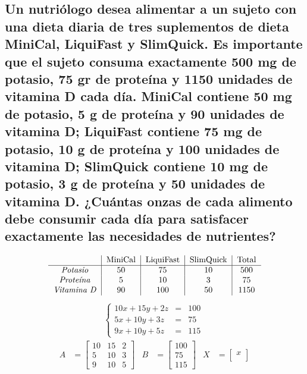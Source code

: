 \documentclass[10pt, a4paper]{article}
\begin{document}
\subsection{Un nutriólogo desea alimentar a un sujeto con una dieta diaria de tres suplementos de dieta MiniCal, LiquiFast y SlimQuick. Es importante que el sujeto consuma exactamente 500 mg de potasio, 75 gr de proteína y 1150 unidades de vitamina D cada día. MiniCal contiene 50 mg de potasio, 5 g de proteína y 90 unidades de vitamina D; LiquiFast contiene 75 mg de potasio, 10 g de proteína y 100 unidades de vitamina D; SlimQuick contiene 10 mg de potasio, 3 g de proteína y 50 unidades de vitamina D. ¿Cuántas onzas de cada alimento debe consumir cada día para satisfacer exactamente las necesidades de nutrientes?}
\begin{multicols*}{2}
  \columnseprule=1pt
\begin{align*}
  \begin{tabular}{c|c|c|c|c}
    & MiniCal & LiquiFast & SlimQuick & Total\\
    \hline
    \textit{Potasio} & 50 & 75 & 10 & 500\\
    \textit{Proteína} & 5 & 10 & 3 & 75\\
    \textit{Vitamina D} & 90 & 100 & 50 & 1150
  \end{tabular}
\end{align*}
\begin{align*}
  \left\{
  \begin{array}{rcl}
    10x+15y+2z &= &100\\
    5x+10y+3z &= &75\\
    9x+10y+5z &= &115
  \end{array}
  \right.\
\end{align*}
\begin{align*}
  A &= \begin{bmatrix}
    10 & 15 & 2\\
    5 & 10 & 3\\
    9 & 10 & 5
  \end{bmatrix}&
  B &= \begin{bmatrix}
    100\\
    75\\
    115
  \end{bmatrix}&
  X &= \begin{bmatrix}
    x\\

\end{bmatrix}
\end{align*}
\end{multicols*}
\end{document}
